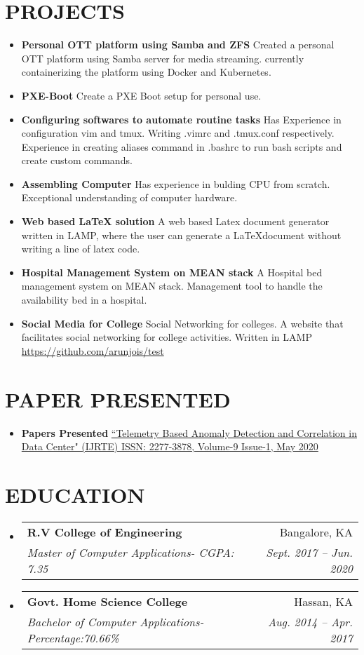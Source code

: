 \documentclass[letterpaper,11pt]{article}
\makeatletter
\newcommand{\resumeItem}[2]{
	\item\small{
		\textbf{#1}{ #2 \vspace{-2pt}}
	}
}
\newcommand{\resumeSubheading}[4]{
	\vspace{-1pt}\item
	\begin{tabular*}{0.97\textwidth}[t]{l@{\extracolsep{\fill}}r}
		\textbf{#1} & #2 \\
		\textit{\small#3} & \textit{\small #4} \\
	\end{tabular*}\vspace{-5pt}
}
\newcommand{\resumeSubItem}[2]{\resumeItem{#1}{#2}\vspace{-4pt}}
\newcommand{\resumeSubHeadingListStart}{\begin{itemize}[leftmargin=*]}
\newcommand{\resumeSubHeadingListEnd}{\end{itemize}}
\makeatother
\begin{document}
	\section{\textbf{PROJECTS}}
	\resumeSubHeadingListStart
	\resumeSubItem{Personal OTT platform using Samba and ZFS}{Created a personal OTT 
	platform using Samba server for media streaming. currently containerizing the 
	platform using Docker and Kubernetes. }
	\resumeSubItem{PXE-Boot}{Create a PXE Boot setup for personal use.}
	\resumeSubItem{Configuring softwares to automate routine tasks}{Has Experience in 
	configuration vim and tmux. Writing .vimrc and .tmux.conf respectively. Experience in 
	creating aliases command in .bashrc to run bash scripts and create custom commands.}
	\resumeSubItem{Assembling Computer}{Has experience in bulding CPU from scratch. 
	Exceptional understanding of computer hardware.}
	
	\resumeSubItem{Web based LaTeX solution}
	{A web based Latex document generator written in LAMP, where the user can generate 
	a \LaTeX  document without writing a line of latex code. }
	\resumeSubItem{Hospital Management System on MEAN stack}
	{A Hospital bed management system on MEAN stack. Management tool to handle the 
	availability bed in a hospital.}
	\resumeSubItem{Social Media for College}
	{Social Networking for colleges. A website that facilitates social networking for 
		college activities. Written in LAMP \href{https://github.com/arunjois/test} 
		{https://github.com/arunjois/test}}
	\resumeSubHeadingListEnd
	\section{\textbf{ PAPER PRESENTED}}
	\resumeSubHeadingListStart
	\resumeSubItem{Papers Presented} { 
		\href{https://www.ijrte.org/wp-content/uploads/papers/v9i1/A2725059120.pdf}{``Telemetry Based Anomaly Detection and Correlation in Data Center"  (IJRTE) ISSN: 2277-3878, 
			Volume-9 Issue-1, May 2020}}
	\resumeSubHeadingListEnd
	\section{\textbf{EDUCATION}}
	\resumeSubHeadingListStart
	\resumeSubheading
	{R.V College of Engineering}{Bangalore, KA}
	{Master of Computer Applications-  CGPA: 7.35}{Sept. 2017 -- Jun. 2020}
	\resumeSubheading
	{Govt. Home Science College}{Hassan, KA}
	{Bachelor of Computer Applications-  Percentage:70.66\% }{Aug. 2014 -- Apr. 2017}
	\resumeSubHeadingListEnd
	
	
\end{document}
